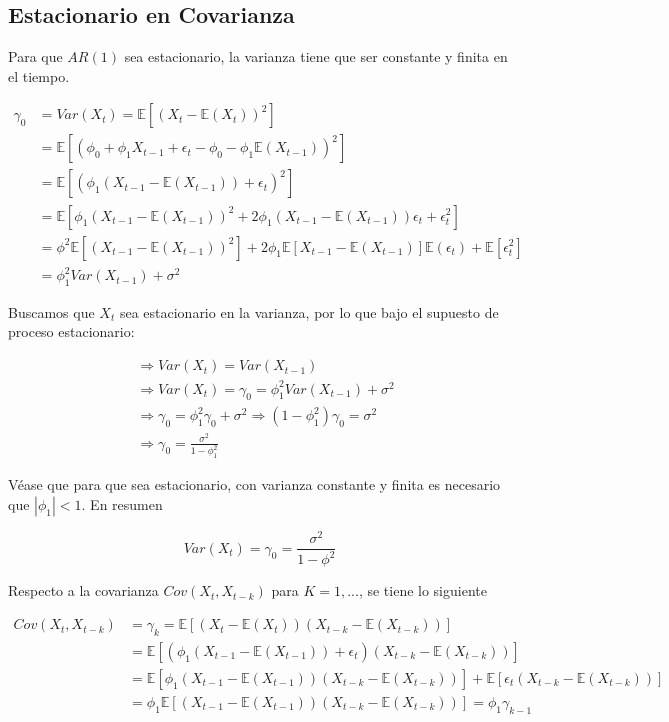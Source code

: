 \documentclass[
  a4paper,
  oneside,
  openany]{book}
\begin{document}
\hypertarget{estacionario-en-covarianza}{%
\subsection{Estacionario en Covarianza}\label{estacionario-en-covarianza}}

Para que \(AR(1)\) sea estacionario, la varianza tiene que ser constante y finita en el tiempo.

\[
\begin{split}
\gamma_0 &= Var(X_t)=\mathbb{E} \left[(X_t -\mathbb{E}(X_t))^{2}\right]\\
&= \mathbb{E}\left[(\phi_0+\phi_1X_{t-1}+\epsilon_t-\phi_0-\phi_1\mathbb{E}(X_{t-1}))^2\right]\\
& = \mathbb{E}\left[(\phi_1(X_{t-1}-\mathbb{E}(X_{t-1}))+\epsilon_t)^2\right]\\
& = \mathbb{E}\left[\phi_1(X_{t-1}-\mathbb{E}(X_{t-1}))^2+2\phi_1(X_{t-1}-\mathbb{E}(X_{t-1}))\epsilon_t+\epsilon_t^2\right]\\
& = \phi^2 \mathbb{E}\left[(X_{t-1}-\mathbb{E}(X_{t-1}))^2\right] +2\phi_1\mathbb{E}\left[X_{t-1}-\mathbb{E}(X_{t-1})\right]\mathbb{E}(\epsilon_t)+\mathbb{E}[\epsilon_t^2]\\
&= \phi_1^2 Var(X_{t-1})+ \sigma^2
\end{split}
\]

Buscamos que \(X_t\) sea estacionario en la varianza, por lo que bajo el supuesto de proceso estacionario:

\[
\begin{split}
&\Longrightarrow  Var(X_t)=Var(X_{t-1})\\
&\Longrightarrow  Var(X_t)= \gamma_0= \phi_1^2 Var(X_{t-1})+\sigma^2\\
&\Longrightarrow \gamma_0=\phi_1^2 \gamma_0+ \sigma^2 \Longrightarrow (1-\phi_1^2) \gamma_0=\sigma^2\\
&\Longrightarrow \gamma_0 = \frac{\sigma^2}{1-\phi_1^2}
\end{split}
\]

Véase que para que sea estacionario, con varianza constante y finita es necesario que \(| \phi_1|< 1\). En resumen

\[Var(X_t)= \gamma_0 = \frac{\sigma^2}{1-\phi^2}\]

Respecto a la covarianza \(Cov(X_t,X_{t-k})\) para \(K=1,...\), se tiene lo siguiente

\[
\begin{split}
Cov(X_t,X_{t-k})&=\gamma_k = \mathbb{E}\left[(X_t-\mathbb{E}(X_t))(X_{t-k}-\mathbb{E}(X_{t-k}))\right]\\
& = \mathbb{E}\left[(\phi_1(X_{t-1}-\mathbb{E}(X_{t-1}))+\epsilon_t)(X_{t-k}-\mathbb{E}(X_{t-k}))\right]\\
& = \mathbb{E}\left[\phi_1(X_{t-1}-\mathbb{E}(X_{t-1}))(X_{t-k}-\mathbb{E}(X_{t-k}))\right] + \mathbb{E}\left[\epsilon_t(X_{t-k}-\mathbb{E}(X_{t-k}))\right]\\
& = \phi_1\mathbb{E}\left[(X_{t-1}-\mathbb{E}(X_{t-1}))(X_{t-k}-\mathbb{E}(X_{t-k}))\right] = \phi_1\gamma_{k-1}
\end{split}
\]
\end{document}
